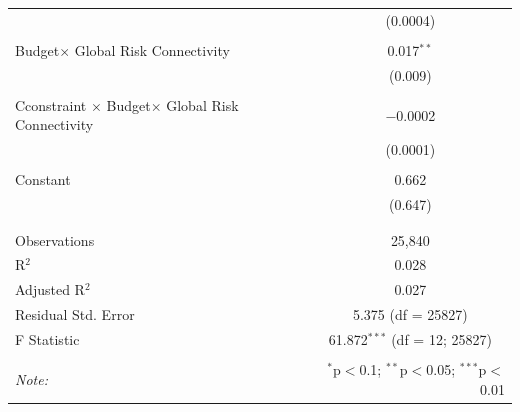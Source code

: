 \begin{table}[!htbp]
{\begin{tabular}{@{\extracolsep{5pt}}lc}
  & (0.0004) \\ 
  & \\ 
 Budget$\times$ Global Risk Connectivity  & 0.017$^{**}$ \\ 
  & (0.009) \\ 
  & \\ 
Cconstraint $\times$ Budget$\times$ Global Risk Connectivity  & $-$0.0002 \\ 
  & (0.0001) \\ 
  & \\ 
 Constant & 0.662 \\ 
  & (0.647) \\ 
  & \\ 
\hline \\[-1.8ex] 
Observations & 25,840 \\ 
R$^{2}$ & 0.028 \\ 
Adjusted R$^{2}$ & 0.027 \\ 
Residual Std. Error & 5.375 (df = 25827) \\ 
F Statistic & 61.872$^{***}$ (df = 12; 25827) \\ 
\hline 
\hline \\[-1.8ex] 
\textit{Note:}  & \multicolumn{1}{r}{$^{*}$p$<$0.1; $^{**}$p$<$0.05; $^{***}$p$<$0.01} \\ 
\end{tabular}
}
\end{table} 

\cleardoublepage